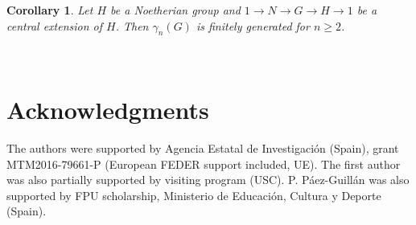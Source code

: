\documentclass[12pt,reqno]{amsart}
\newtheorem{corollary}[subsection]{Corollary}
\theoremstyle{definition}
\numberwithin{equation}{section}
\theoremstyle{definition}
\begin{document}
\begin{corollary}
Let $H$ be a Noetherian group and $1\to N \to G \to H \to 1$ be a central extension of $H$. Then $\gamma_n(G)$ is finitely generated for $n\geq 2$.
\end{corollary}

\


\section*{Acknowledgments}
The authors were supported by  Agencia Estatal de Investigaci\'on (Spain), grant MTM2016-79661-P (European FEDER support included, UE).
 The first author was also partially supported by  visiting
program (USC).
P. P\'aez-Guill\'an was also supported by FPU scholarship, Ministerio de Educaci\'on, Cultura
y Deporte (Spain).
\end{document}
